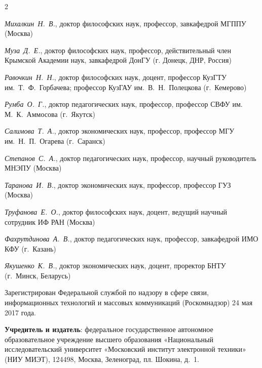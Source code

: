 \begin{multicols}{2}
\begin{flushleft}
    \noindent \textit{Михалкин Н. В.}, доктор философских наук, профессор, завкафедрой МГППУ (Москва)
    
    \noindent \textit{Муза Д. Е.}, доктор философских наук, профессор, действительный член Крымской Академии наук, завкафедрой ДонГУ (г. Донецк, ДНР, Россия) 
    
    \noindent \textit{Равочкин Н. Н.}, доктор философских наук, доцент, профессор КузГТУ им. Т. Ф. Горбачева; профессор КузГАУ им. В. Н. Полецкова (г. Кемерово)
    
    \noindent \textit{Румба О. Г.}, доктор педагогических наук, профессор, профессор СВФУ им. М. К. Аммосова (г. Якутск)
    
    \noindent \textit{Салимова Т. А.}, доктор экономических наук, профессор, профессор МГУ им. Н. П. Огарева (г. Саранск)
    
    \noindent \textit{Степанов С. А.}, доктор педагогических наук, профессор, научный руководитель МНЭПУ (Москва)
    
    \noindent \textit{Таранова И. В.}, доктор экономических наук, профессор, профессор ГУЗ (Москва)
   
    \noindent \textit{Труфанова Е. О.}, доктор философских наук, доцент, ведущий научный сотрудник ИФ РАН (Москва)

    \noindent \textit{Фахрутдинова А. В.}, доктор педагогических наук, профессор, завкафедрой ИМО КФУ (г. Казань)
    
    \noindent \textit{Якушенко К. В.}, доктор экономических наук, доцент, проректор БНТУ (г. Минск, Беларусь)
\end{flushleft}    
\end{multicols}

\begin{flushleft}
\scriptsize
Зарегистрирован Федеральной службой по надзору в сфере связи, информационных технологий
и массовых коммуникаций (Роскомнадзор) 24 мая 2017 года.


\textbf{Учредитель и издатель}: федеральное государственное автономное образовательное учреждение
высшего образования «Национальный исследовательский университет «Московский институт
электронной техники» (НИУ МИЭТ), 124498, Москва, Зеленоград, пл. Шокина, д. 1.
\end{flushleft}

